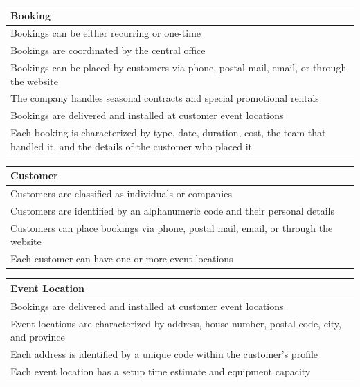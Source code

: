 \begin{table}[H]
\centering
\begin{tabular}{|p{15cm}|}
\hline
\textbf{Booking} \\
\hline
Bookings can be either recurring or one-time \\
\hline
Bookings are coordinated by the central office \\
\hline
Bookings can be placed by customers via phone, postal mail, email, or through the website \\
\hline
The company handles seasonal contracts and special promotional rentals \\
\hline
Bookings are delivered and installed at customer event locations \\
\hline
Each booking is characterized by type, date, duration, cost, the team that handled it, and the details of the customer who placed it \\
\hline
\end{tabular}
\end{table}


\begin{table}[H]
\centering
\begin{tabular}{|p{15cm}|}
\hline
\textbf{Customer} \\
\hline
Customers are classified as individuals or companies \\
\hline
Customers are identified by an alphanumeric code and their personal details \\
\hline
Customers can place bookings via phone, postal mail, email, or through the website \\
\hline
Each customer can have one or more event locations \\
\hline
\end{tabular}
\end{table}


\begin{table}[H]
\centering
\begin{tabular}{|p{15cm}|}
\hline
\textbf{Event Location} \\
\hline
Bookings are delivered and installed at customer event locations \\
\hline
Event locations are characterized by address, house number, postal code, city, and province \\
\hline
Each address is identified by a unique code within the customer's profile \\
\hline
Each event location has a setup time estimate and equipment capacity \\
\hline
\end{tabular}
\end{table}



